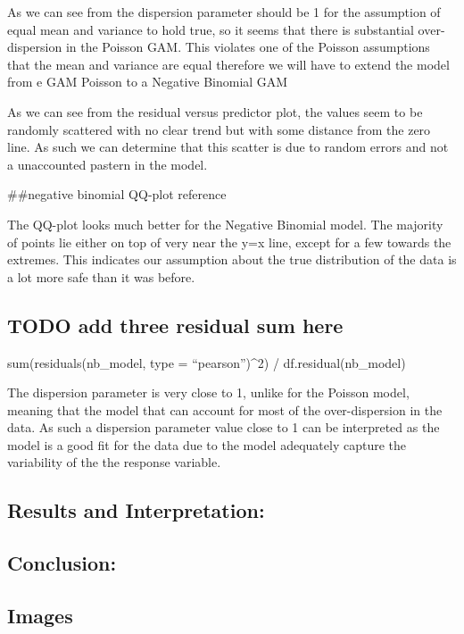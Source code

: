 \documentclass[
  letterpaper,
  DIV=11,
  numbers=noendperiod]{scrartcl}
\begin{document}
As we can see from the dispersion parameter should be 1 for the
assumption of equal mean and variance to hold true, so it seems that
there is substantial over-dispersion in the Poisson GAM. This violates
one of the Poisson assumptions that the mean and variance are equal
therefore we will have to extend the model from e GAM Poisson to a
Negative Binomial GAM

As we can see from the residual versus predictor plot, the values seem
to be randomly scattered with no clear trend but with some distance from
the zero line. As such we can determine that this scatter is due to
random errors and not a unaccounted pastern in the model.

\#\#negative binomial QQ-plot reference

The QQ-plot looks much better for the Negative Binomial model. The
majority of points lie either on top of very near the y=x line, except
for a few towards the extremes. This indicates our assumption about the
true distribution of the data is a lot more safe than it was before.

\hypertarget{todo-add-three-residual-sum-here}{%
\subsection{TODO add three residual sum
here}\label{todo-add-three-residual-sum-here}}

sum(residuals(nb\_model, type = ``pearson'')\^{}2) /
df.residual(nb\_model)

The dispersion parameter is very close to 1, unlike for the Poisson
model, meaning that the model that can account for most of the
over-dispersion in the data. As such a dispersion parameter value close
to 1 can be interpreted as the model is a good fit for the data due to
the model adequately capture the variability of the the response
variable.

\hypertarget{results-and-interpretation}{%
\subsection{Results and
Interpretation:}\label{results-and-interpretation}}

\hypertarget{conclusion}{%
\subsection{Conclusion:}\label{conclusion}}

\hypertarget{images}{%
\subsection{Images}\label{images}}
\end{document}
